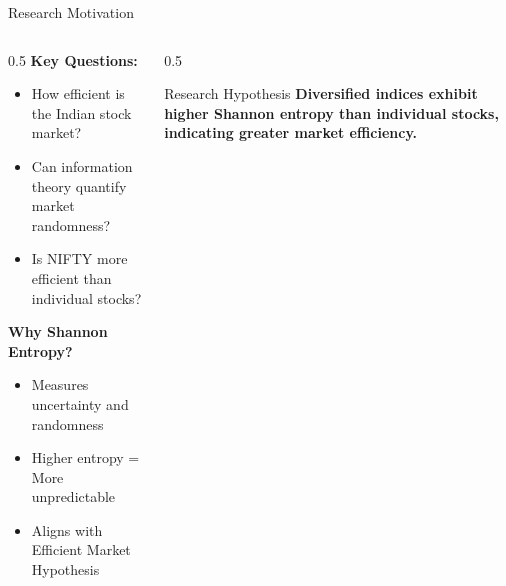 \documentclass[aspectratio=169,12pt,xcolor=table]{beamer}
\begin{document}
\begin{frame}{Research Motivation}
\begin{columns}[T]
\begin{column}{0.5\textwidth}
    \textbf{Key Questions:}
    \begin{itemize}
        \item How efficient is the Indian stock market?
        \item Can information theory quantify market randomness?
        \item Is NIFTY more efficient than individual stocks?
    \end{itemize}
    
    \vspace{0.5cm}
    \textbf{Why Shannon Entropy?}
    \begin{itemize}
        \item Measures uncertainty and randomness
        \item Higher entropy = More unpredictable
        \item Aligns with Efficient Market Hypothesis
    \end{itemize}
\end{column}

\begin{column}{0.5\textwidth}
    \begin{block}{Research Hypothesis}
        \textcolor{niftyblue}{\textbf{Diversified indices exhibit higher Shannon entropy than individual stocks, indicating greater market efficiency.}}
    \end{block}
    
    \vspace{0.3cm}
\end{column}
\end{columns}
\end{frame}
\end{document}

